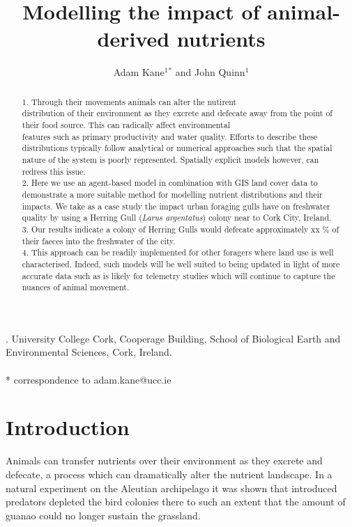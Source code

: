 \documentclass[a4paper,12pt]{article}
\title{Modelling the impact of animal-derived nutrients}
\author{Adam Kane$^1$$^*$ and John Quinn$^1$}
\begin{document}
. University College Cork, Cooperage Building, School of Biological Earth and Environmental Sciences, Cork, Ireland. 
\\ \\ * correspondence to adam.kane@ucc.ie

\newpage
\begin{abstract} 
1. Through their movements animals can alter the nutirent \\ distribution of their environment as they excrete and defecate away from the point of their food source. 
This can radically affect environmental \\ features such as primary productivity and water quality. 
Efforts to describe these distributions typically follow analytical or numerical approaches such that the spatial nature of the system is poorly represented. 
Spatially explicit models however, can redress this issue. \\

2. Here we use an agent-based model in combination with GIS land cover data to demonstrate a more suitable method for modelling nutrient distributions and their impacts. 
We take as a case study the impact urban foraging gulls have on freshwater quality by using a Herring Gull (\textit{Larus argentatus}) colony near to Cork City, Ireland. \\

3. Our results indicate a colony of Herring Gulls would defecate approximately xx \% of their faeces into the freshwater of the city. \\

4. This approach can be readily implemented for other foragers where land use is well characterised. 
Indeed, such models will be well suited to being updated in light of more accurate data such as is likely for telemetry studies which will continue to capture the nuances of animal movement.

\end{abstract}

\newpage


\section*{Introduction}
Animals can transfer nutrients over their environment as they excrete and defecate, a process which can dramatically alter the nutrient landscape. 
In a natural experiment on the Aleutian archipelago it was shown that introduced predators depleted the bird colonies there to such an extent that the amount of guanao could no longer sustain the grassland. 
\end{document}
